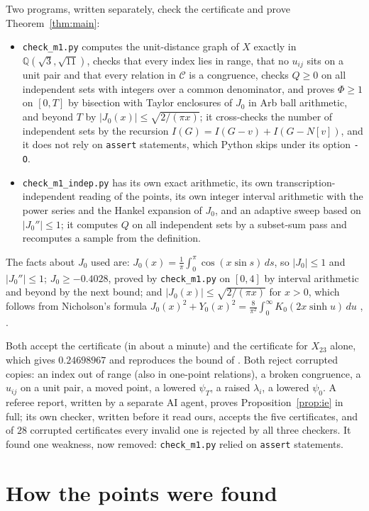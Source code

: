 \documentclass[11pt,a4paper]{amsart}
\theoremstyle{remark}
\newcommand{\Q}{\mathbb{Q}}
\begin{document}
Two programs, written separately, check the certificate and prove Theorem~\ref{thm:main}:
\begin{itemize}
\item \texttt{check\_m1.py} computes the unit-distance graph of $X$ exactly in $\Q(\sqrt3,\sqrt{11})$, checks that every
index lies in range, that no $u_{ij}$ sits on a unit pair and that every relation in $\mathcal C$ is a congruence, checks
$Q\ge0$ on all independent sets with integers over a common denominator, and proves $\Phi\ge1$ on $[0,T]$ by bisection
with Taylor enclosures of $J_0$ in Arb ball arithmetic, and beyond $T$ by $|J_0(x)|\le\sqrt{2/(\pi x)}$; it
cross-checks the number of independent sets by the recursion $I(G)=I(G-v)+I(G-N[v])$, and it does not rely on
\texttt{assert} statements, which Python skips under its option \texttt{-O}.
\item \texttt{check\_m1\_indep.py} has its own exact arithmetic, its own transcription-independent reading of the points,
its own integer interval arithmetic with the power series and the Hankel expansion of $J_0$, and an adaptive sweep based
on $|J_0''|\le1$; it computes $Q$ on all independent sets by a subset-sum pass and recomputes a sample from the
definition.
\end{itemize}
The facts about $J_0$ used are: $J_0(x)=\frac1\pi\int_0^\pi\cos(x\sin s)\,ds$, so $|J_0|\le1$ and $|J_0''|\le1$;
$J_0\ge-0.4028$, proved by \texttt{check\_m1.py} on $[0,4]$ by interval arithmetic and beyond by the next bound; and
$|J_0(x)|\le\sqrt{2/(\pi x)}$ for $x>0$, which follows from Nicholson's formula
$J_0(x)^2+Y_0(x)^2=\frac8{\pi^2}\int_0^\infty K_0(2x\sinh u)\,du$ \cite[10.9.30]{DLMF}, \cite[§§13.73--13.74]{Watson}.

Both accept the certificate (in about a minute) and the certificate for $X_{23}$ alone, which gives $0.24698967$ and
reproduces the bound of \cite{ACMVZ}. Both reject corrupted copies: an index out of range (also in one-point
relations), a broken congruence, a $u_{ij}$ on a unit pair, a moved point, a lowered $\psi_T$, a raised $\lambda_i$, a
lowered $\psi_0$. A referee report, written by a separate AI agent, proves Proposition~\ref{prop:ie} in full; its own checker, written before it read ours, accepts the five certificates, and of $28$ corrupted certificates every invalid one is rejected by all three checkers. It found one weakness, now removed: \texttt{check\_m1.py} relied on \texttt{assert} statements.

\section{How the points were found}\label{sec:search}
\end{document}
